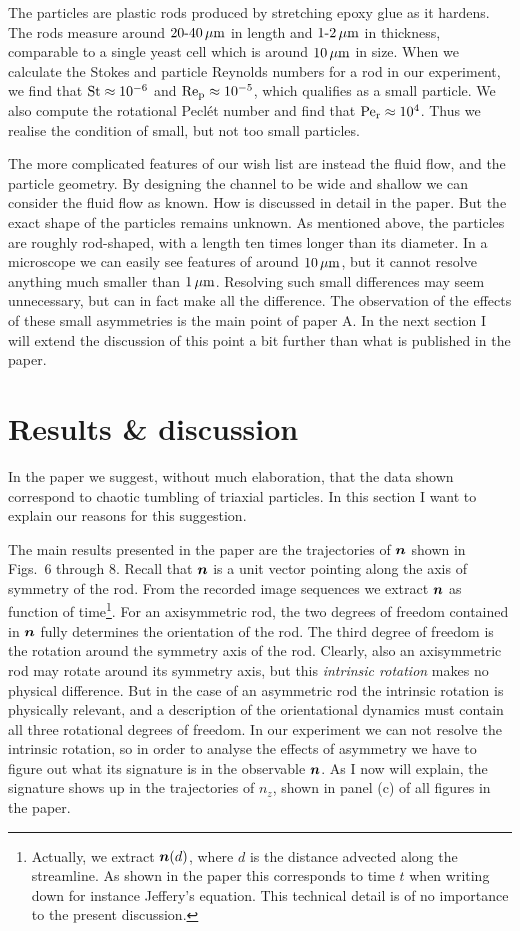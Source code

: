 \documentclass[thesis.tex]{subfiles}
\begin{document}
The particles are plastic rods produced by stretching epoxy glue as it hardens. The rods measure around $\unit[20\textrm{-}40]{\mu m}$ in length and $\unit[1\textrm{-}2]{\mu m}$ in thickness, comparable to a single yeast cell which is around $\unit[10]{\mu m}$ in size. When we calculate the Stokes and particle Reynolds numbers for a rod in our experiment, we find that $\mbox{St} \approx 10^{-6}$ and $\mbox{Re}_{\mathrm p} \approx 10^{-5}$, which qualifies as a small particle. We also compute the rotational Pecl\'et number and find that $\mbox{Pe}_{\mathrm r}\approx10^{4}$. Thus we realise the condition of small, but not too small particles. 

The more complicated features of our wish list are instead the fluid flow, and the particle geometry. By designing the channel to be wide and shallow we can consider the fluid flow as known. How is discussed in detail in the paper. But the exact shape of the particles remains unknown. As mentioned above, the particles are roughly rod-shaped, with a length ten times longer than its diameter. In a microscope we can easily see features of around $\unit[10]{\mu m}$, but it cannot resolve anything much smaller than $\unit[1]{\mu m}$. Resolving such small differences may seem unnecessary, but can in fact make all the difference. The observation of the effects of these small asymmetries is the main point of paper A. In the next section I will extend the discussion of this point a bit further than what is published in the paper.

\section{Results \& discussion}

In the paper we suggest, without much elaboration, that the data shown correspond to chaotic tumbling of triaxial particles. In this section I want to explain our reasons for this suggestion.

The main results presented in the paper are the trajectories of $\mbox{\boldmath$n$}$ shown in Figs.~6 through 8. Recall that $\mbox{\boldmath$n$}$ is a unit vector pointing along the axis of symmetry of the rod. From the recorded image sequences we extract $\mbox{\boldmath$n$}$ as function of time\footnote{Actually, we extract $\mbox{\boldmath$n$}(d)$, where $d$ is the distance advected along the streamline. As shown in the paper this corresponds to time $t$ when writing down for instance Jeffery's equation. This technical detail is of no importance to the present discussion.}. For an axisymmetric rod, the two degrees of freedom contained in $\mbox{\boldmath$n$}$ fully determines the orientation of the rod. The third degree of freedom is the rotation around the symmetry axis of the rod. Clearly, also an axisymmetric rod may rotate around its symmetry axis, but this \emph{intrinsic rotation} makes no physical difference. But in the case of an asymmetric rod the intrinsic rotation is physically relevant, and a description of the orientational dynamics must contain all three rotational degrees of freedom. In our experiment we can not resolve the intrinsic rotation, so in order to analyse the effects of asymmetry we have to figure out what its signature is in the observable $\mbox{\boldmath$n$}$. As I now will explain, the signature shows up in the trajectories of $n_z$, shown in panel (c) of all figures in the paper. 
\end{document}
